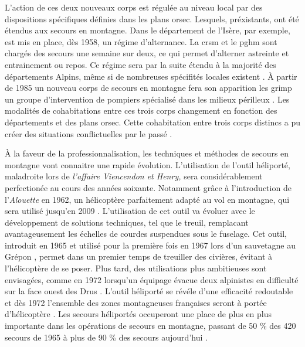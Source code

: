 L'action de ces deux nouveaux corps est régulée au niveau local par
des dispositions spécifiques définies dans les plans
\ac{orsec}. Lesquels, préxistants, ont été étendus aux secours en
montagne. Dans le département de l'Isère, par exemple, est mis en
place, dès 1958, un régime d'alternance. La \ac{crsm} et le \ac{pghm}
sont chargés des secours une semaine sur deux, ce qui permet
d'alterner astreinte et entrainement ou repos. Ce régime sera par la
suite étendu à la majorité des départements Alpins, même si de
nombreuses spécifités locales existent \autocite{Halle2007}. À partir
de 1985 un nouveau corps de secours en montagne fera son apparition
les \ac{grimp} un groupe d'intervention de pompiers spécialisé dans
les milieux périlleux \autocite{CFDLD}. Les modalités de cohabitations
entre ces trois corps changement en fonction des départements et des
plans \ac{orsec}.
Cette cohabitation entre trois corps distincs a pu créer des
situations conflictuelles par le passé \autocite{Soule2002,
  Ganser2012}.

À la faveur de la professionnalisation, les techniques et méthodes de
secours en montagne vont connaitre une rapide évolution. L'utilisation
de l'outil héliporté, maladroite lors de \emph{l'affaire Viencendon et
  Henry,} sera considérablement perfectionée au cours des années
soixante. Notamment grâce à l'introduction de l'\emph{Alouette
  } en 1962, un hélicoptère parfaitement adapté au vol en
montagne, qui sera utilisé jusqu'en 2009 \autocite{Elie2006, Lafond,
  Lafond2011b}. L'utilisation de cet outil va évoluer avec le
développement de solutions techniques, tel que le treuil, remplacant
avantageusement les échelles de courdes suspendues sous le
fuselage. Cet outil, introduit en 1965 et utilisé pour la première
fois en 1967 lors d'un sauvetagne au Grépon \autocite{Lafond2011a},
permet dans un premier temps de treuiller des civières, évitant à
l'hélicoptère de se poser. Plus tard, des utilisations plus
ambitieuses sont envisagées, comme en 1972 lorsqu'un équipage évacue
deux alpinistes en difficulté sur la face ouest des Drus
\autocite{Ministere2013}. L'outil héliporté se révéle d'une efficacité
redoutable et dès 1972 l'ensemble des zones montagneuses françaises
seront à portée d'hélicoptère \autocite{CFDLD}. Les secours héliportés
occuperont une place de plus en plus importante dans les opérations de
secours en montagne, passant de 50 \% des 420 secours de 1965
\autocite{CFDLD} à plus de 90 \% des secours aujourd'hui
\autocite{Halle2007}.

